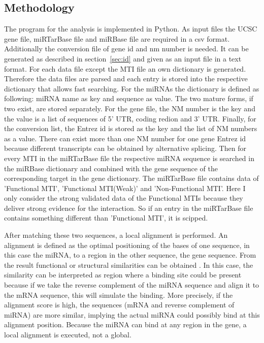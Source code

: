 \documentclass[12pt]{article}
\begin{document}
\vspace{1cm}


\subsection{Methodology}


The program for the analysis is implemented in Python. As input files the UCSC gene file, miRTarBase file and miRBase file are required in a csv format. Additionally the conversion file of gene id and nm number is needed. It can be generated as described in section~\ref{sec:id} and given as an input file in a text format. 
For each data file except the MTI file an own dictionary is generated. Therefore the data files are parsed and each entry is stored into the respective dictionary that allows fast searching. For the miRNAs the dictionary is defined as following: miRNA name as key and sequence as value. The two mature forms, if two exist, are stored separately. For the gene file, the NM number is the key and the value is a list of sequences of 5' UTR, coding redion and 3' UTR. Finally, for the conversion list, the Entrez id is stored as the key and the list of NM numbers as a value. There can exist more than one NM number for one gene Entrez id because different transcripts can be obtained by alternative splicing. 
Then for every MTI in the miRTarBase file the respective miRNA sequence is searched in the miRBase dictionary and combined with the gene sequence of the corresponding target in the gene dictionary. The miRTarBase file contains data of 'Functional MTI', 'Functional MTI(Weak)' and 'Non-Functional MTI'. Here I only consider the strong validated data of the Functional MTIs because they deliver strong evidence for the interaction. So if an entry in the miRTarBase file contains something different than 'Functional MTI', it is scipped.

After matching these two sequences, a local alignment is performed. An alignment is defined as the optimal positioning of the bases of one sequence, in this case the miRNA, to a region in the other sequence, the gene sequence. From the result functional or structural similarities can be obtained \cite{alignment}. In this case, the similarity can be interpreted as region where a binding site could be present because if we take the reverse complement of the miRNA sequence and align it to the mRNA sequence, this will simulate the binding. More precisely, if the alignment score is high, the sequences (mRNA and reverse complement of miRNA) are more similar, implying the actual miRNA could possibly bind at this alignment position. Because the miRNA can bind at any region in the gene, a local alignment is executed, not a global.\\
\end{document}
